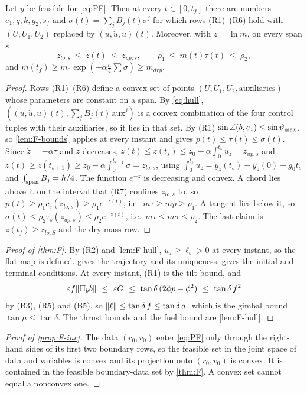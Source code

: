 \begin{lemma}\label{lem:F-hull}
Let $y$ be feasible for \eqref{eq:PF}. Then at every $t\in[0,t_f]$ there are numbers $e_1,q,k,g_2,s_f$ and $\sigma(t)=\sum_jB_j(t)\sigma^j$
for which rows (R1)--(R6) hold with $(U,U_1,U_2)$ replaced by $(u,\dot u,\ddot u)(t)$. Moreover, with $z=\ln m$, on every span $s$
\[
z_{lo,s}\ \le\ z(t)\ \le\ z_{up,s},\qquad \rho_1\ \le\ m(t)\tau(t)\ \le\ \rho_2 ,
\]
and $m(t_f)\ge m_0\exp(-\alpha\tfrac h4\sum\sigma)\ge m_{dry}$.
\end{lemma}
\begin{proof}
Rows (R1)--(R6) define a convex set of points $(U,U_1,U_2,\text{auxiliaries})$ whose parameters are constant on a span. By
\eqref{eq:hull}, $((u,\dot u,\ddot u)(t),\sum_jB_j(t)\,\mathrm{aux}^j)$ is a convex combination of the four control tuples with their
auxiliaries, so it lies in that set. By (R1) $\sin\angle(b,e_z)\le\sin\vartheta_{\max}$, so \cref{lem:F-bounds} applies at every instant and
gives $p(t)\le\tau(t)\le\sigma(t)$. Since $\dot z=-\alpha\tau$ and $z$ decreases,
$z(t)\le z(t_s)\le z_0-\alpha\int_0^{t_s}u_z=z_{up,s}$ and $z(t)\ge z(t_{s+1})\ge z_0-\alpha\int_0^{t_{s+1}}\sigma=z_{lo,s}$, using
$\int_0^{t_s}u_z=\dot y_z(t_s)-\dot y_z(0)+g_0t_s$ and $\int_{\rm span}B_j=h/4$. The function $e^{-z}$ is decreasing and convex. A chord
lies above it on the interval that (R7) confines $z_{lo,s}$ to, so $p(t)\ge\rho_1c_s(z_{lo,s})\ge\rho_1e^{-z(t)}$, i.e.\ $m\tau\ge mp\ge\rho_1$.
A tangent lies below it, so $\sigma(t)\le\rho_2\tau_s(z_{up,s})\le\rho_2e^{-z(t)}$, i.e.\ $m\tau\le m\sigma\le\rho_2$. The last claim is
$z(t_f)\ge z_{lo,S}$ and the dry-mass row.
\end{proof}

\begin{proof}[Proof of \cref{thm:F}]
By (R2) and \cref{lem:F-hull}, $u_z\ge\ell_b>0$ at every instant, so the flat map is defined.  gives the trajectory and
its uniqueness.  gives the initial and terminal conditions. At every instant, (R1) is the tilt bound, and
\[
\varepsilon f\norm{\Pi_b\ddot b}\ \le\ \varepsilon G\ \le\ \tan\delta\,(2\phi p-\phi^2)\ \le\ \tan\delta\,f^2
\]
by (B3), (R5) and (B5), so $\lVert \ell\rVert\le\tan\delta\,f\le\tan\delta\,a$, which is the gimbal bound $\tan\mu\le\tan\delta$. The thrust bounds
and the fuel bound are \cref{lem:F-hull}.
\end{proof}

\begin{proof}[Proof of \cref{prop:F-inc}]
The data $(r_0,v_0)$ enter \eqref{eq:PF} only through the right-hand sides of its first two boundary rows, so the feasible set in the
joint space of data and variables is convex and its projection onto $(r_0,v_0)$ is convex. It is contained in the feasible
boundary-data set by \cref{thm:F}. A convex set cannot equal a nonconvex one.
\end{proof}
